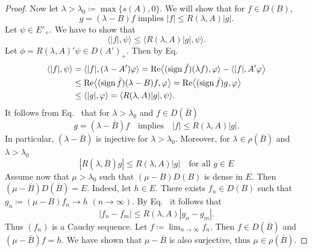 \begin{proof}
Now let $\lambda > \lambda_{0} \coloneq \max\{s(A),0\}$. 
We will show that for $f \in D(B)$,
\begin{equation}\label{eq:c2-4.6}
g = (\lambda - B)f \text{ implies } |f| \leq R(\lambda,A)|g|.
\end{equation}
Let $\psi \in E'_{+}$. 
We have to show that 
\[
\langle|f|,\psi\rangle \leq \langle R(\lambda,A)|g|,\psi\rangle .
\]
Let $\phi = R(\lambda,A)'\psi \in D(A')_{+}$. 
Then by Eq.~
\begin{align*}
\langle|f|,\psi\rangle &= \langle|f|, (\lambda - A')\phi\rangle 
= \Re\mleft\langle(\sign  \bar{f})(\lambda f),\phi\rangle - \langle|f|,A'\phi\mright\rangle\\
&\leq \Re\mleft\langle(\sign  \bar{f})(\lambda - B)f,\phi\mright\rangle = \Re\mleft\langle(\sign  \bar{f})g,\phi\mright\rangle\\
&\leq \langle|g|,\phi\rangle = \langle R(\lambda,A)|g|,\psi\rangle.
\end{align*}
It follows from Eq.~ that for $\lambda > \lambda_{0}$ and $f \in D(\overline{B})$
\begin{equation}\label{eq:c2-4.7}
g = (\lambda - \overline{B})f \quad\text{implies}\quad |f| \leq R(\lambda,A)|g|.
\end{equation}
In particular, $(\lambda - \overline{B})$ is injective for $\lambda > \lambda_{0}$. 
Moreover, for $\lambda \in \rho(\overline{B})$ and 
$\lambda > \lambda_{0}$
\begin{equation}\label{eq:c2-4.8}
|R(\lambda,\overline{B})g| \leq R(\lambda,A)|g| \quad \text{for all } g \in E
\end{equation}
Assume now that $\mu > \lambda_{0}$ such that $(\mu - B)D(B)$ is dense in $E$. 
Then 
$(\mu - \overline{B})D(\overline{B}) = E$. 
Indeed, let $h \in E$. 
There exists $f_{n} \in D(B)$ such that $g_{n} \coloneq (\mu - B)f_{n} \to h$ $(n \to \infty)$. 
By Eq.~ it follows that 
\[
|f_{n} - f_{m}| \leq R(\lambda,A)|g_{n} - g_{m}| .
\] 
Thus $(f_{n})$ is a Cauchy sequence. 
Let $f \coloneq \lim_{n \to \infty} f_{n}$. 
Then $f \in D(\overline{B})$ and $(\mu - \overline{B})f = h$. We have shown that $\mu - \overline{B}$ is also surjective, thus $\mu \in \rho(\overline{B})$.


\end{proof}
